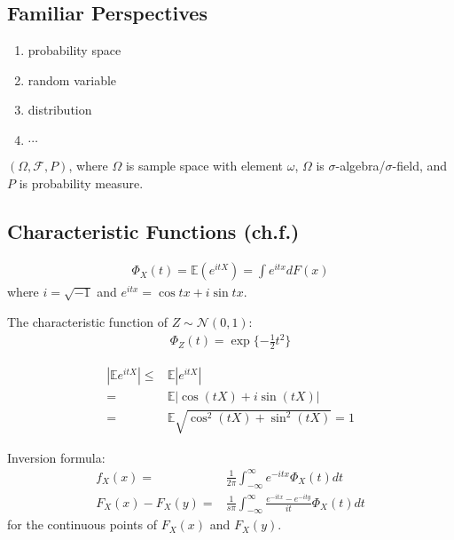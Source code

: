 \subsection{Familiar Perspectives}

\begin{enumerate}
    \item probability space
    \item random variable
    \item distribution
    \item $\cdots$
\end{enumerate}


\begin{definition}
    $(\Omega,\mathcal{F},P)$, 
    where $\Omega$ is sample space with element $\omega$,
    $\Omega$ is $\sigma$-algebra/$\sigma$-field, and 
    $P$ is probability measure.
\end{definition}

\subsection{Characteristic Functions (ch.f.)}

\begin{definition}[ch.f.]
    \begin{gather}
        \Phi_X(t)=\mathbb{E}(e^{itX})=\int{e^{itx}}dF(x)
    \end{gather}
    where $i=\sqrt{-1}$ and $e^{itx}=\cos{tx}+i\sin{tx}$.
\end{definition}

\begin{example}
    The characteristic function of $Z\sim{\mathcal{N}(0,1)}$:
    \begin{gather}
        \Phi_Z(t)=\exp{\{-\frac{1}{2}t^2\}}
    \end{gather}
\end{example}

\begin{align}
    |\mathbb{E}e^{itX}| 
    \leq& \mathbb{E}|e^{itX}| \\
    =& \mathbb{E}|\cos{(tX)}+i\sin{(tX)}| \\
    =& \mathbb{E}\sqrt{\cos^2(tX)+\sin^2(tX)}=1
\end{align}

Inversion formula:
\begin{align}
    f_X(x)=&\frac{1}{2\pi}\int_{-\infty}^\infty{e^{-itx}\Phi_X(t)}dt \\
    F_X(x) - F_X(y)=&\frac{1}{s\pi}\int_{-\infty}^\infty\frac{e^{-itx}-e^{-ity}}{it}\Phi_X(t)dt
\end{align}
for the continuous points of $F_X(x)$ and $F_X(y)$.

